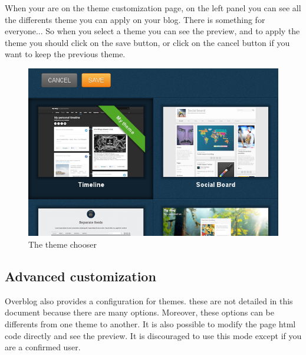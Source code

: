 \documentclass[a4paper,10pt]{article}
\begin{document}
When your are on the theme customization page, on the left panel you can see all the differents theme you can apply on your blog. There is something for
everyone... So when you select a theme you can see the preview, and to apply the theme you should click on the save button, or click on the cancel button if
you want to keep the previous theme.
\begin{figure}[htpb]
 \centering
 \includegraphics[scale=0.43]{Images/ChooseYourTheme.png}
 \caption{The theme chooser}
 \label{customHeader}
\end{figure}

\subsection{Advanced customization}
Overblog also provides a configuration for themes. these are not detailed in this document because there are many options. Moreover, these
options can be differents from one theme to another. It is also possible to modify the page html code directly and see the preview. It is discouraged to use
this mode except if you are a confirmed user.
\end{document}
